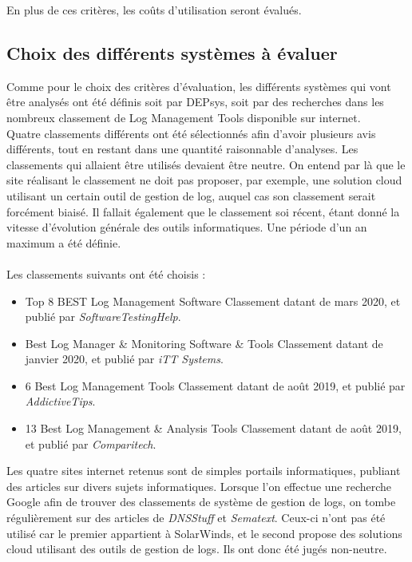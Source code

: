 \documentclass[paper=a4, fontsize=11pt]{scrartcl}
\begin{document}
En plus de ces critères, les coûts d'utilisation seront évalués.\\

\subsection{Choix des différents systèmes à évaluer}

Comme pour le choix des critères d'évaluation, les différents systèmes qui vont être analysés ont été définis soit par DEPsys, soit par des recherches dans les nombreux classement de \og Log Management Tools \fg disponible sur internet.\\
Quatre classements différents ont été sélectionnés afin d'avoir plusieurs avis différents, tout en restant dans une quantité raisonnable d'analyses. Les classements qui allaient être utilisés devaient être neutre. On entend par là que le site réalisant le classement ne doit pas proposer, par exemple, une solution cloud utilisant un certain outil de gestion de log, auquel cas son classement serait forcément biaisé. Il fallait également que le classement soi récent, étant donné la vitesse d'évolution générale des outils informatiques. Une période d'un an maximum a été définie.\\\\
Les classements suivants ont été choisis :
\begin{itemize}
    \item Top 8 BEST Log Management Software \cite{noauthor_top_nodate}
    \subitem Classement datant de mars 2020, et publié par \textit{SoftwareTestingHelp}.
    \item Best Log Manager \& Monitoring Software \& Tools \cite{noauthor_best_nodate}
    \subitem Classement datant de janvier 2020, et publié par \textit{iTT Systems}.
    \item 6 Best Log Management Tools \cite{noauthor_6_2019}
    \subitem Classement datant de août 2019, et publié par \textit{AddictiveTips}.
    \item 13 Best Log Management \& Analysis Tools \cite{says_ten_2019}
    \subitem Classement datant de août 2019, et publié par \textit{Comparitech}.
\end{itemize}

Les quatre sites internet retenus sont de simples portails informatiques, publiant des articles sur divers sujets informatiques. Lorsque l'on effectue une recherche Google afin de trouver des classements de système de gestion de logs, on tombe régulièrement sur des articles de \textit{DNSStuff} et \textit{Sematext}. Ceux-ci n'ont pas été utilisé car le premier appartient à SolarWinds, et le second propose des solutions cloud utilisant des outils de gestion de logs. Ils ont donc été jugés non-neutre.
\end{document}
